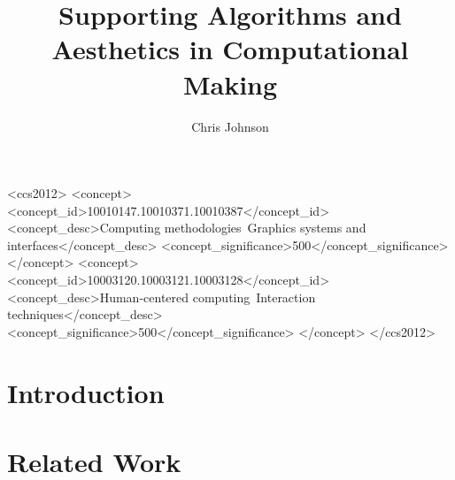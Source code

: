 \documentclass[manuscript,screen,review,anonymous=false]{acmart}
\begin{document}
\title{Supporting Algorithms and Aesthetics in Computational Making}

\author{Chris Johnson}

\renewcommand{\shortauthors}{Johnson}

\begin{abstract}

\end{abstract}

\begin{CCSXML}
<ccs2012>
   <concept>
       <concept_id>10010147.10010371.10010387</concept_id>
       <concept_desc>Computing methodologies~Graphics systems and interfaces</concept_desc>
       <concept_significance>500</concept_significance>
       </concept>
   <concept>
       <concept_id>10003120.10003121.10003128</concept_id>
       <concept_desc>Human-centered computing~Interaction techniques</concept_desc>
       <concept_significance>500</concept_significance>
       </concept>
 </ccs2012>
\end{CCSXML}



\maketitle

\section{Introduction}


\section{Related Work}


% 

% 

% 

% 



\end{document}
